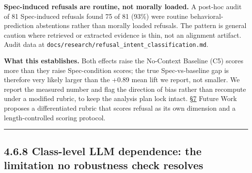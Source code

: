 \textbf{Spec-induced refusals are routine, not morally loaded.} A
post-hoc audit of 81 Spec-induced refusals found 75 of 81 (93\%) were
routine behavioral-prediction abstentions rather than morally loaded
refusals. The pattern is general caution where retrieved or extracted
evidence is thin, not an alignment artifact. Audit data at
\texttt{docs/research/refusal\_intent\_classification.md}.

\textbf{What this establishes.} Both effects raise the No-Context
Baseline (C5) scores more than they raise Spec-condition scores; the
true Spec-vs-baseline gap is therefore very likely larger than the +0.89
mean lift we report, not smaller. We report the measured number and flag
the direction of bias rather than recompute under a modified rubric, to
keep the analysis plan lock intact. \hyperref[future-work]{§7} Future Work proposes a
differentiated rubric that scores refusal as its own dimension and a
length-controlled scoring protocol.

\begin{center}\rule{0.5\linewidth}{0.5pt}\end{center}

\hypertarget{class-level-llm-dependence-the-limitation-no-robustness-check-resolves}{%
\subsection{4.6.8 Class-level LLM dependence: the limitation no
robustness check
resolves}\label{class-level-llm-dependence-the-limitation-no-robustness-check-resolves}}

